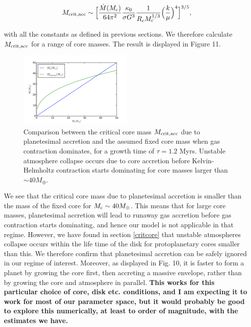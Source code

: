 \documentclass[apj]{emulateapj}
\begin{document}
\begin{equation}
\label{eq:critraf}
M_{\rm{crit, acc}} \sim \Big[\frac{\dot{M}(M_{\rm{c}})}{64 \pi^2} \frac{\kappa_0}{\sigma G^3} \frac{1}{R_c M_c^{1/3}} \Big(\frac{k}{\mu}\Big)^4\Big]^{3/5},
\end{equation}

\noindent with all the constants as defined in previous sections. We therefore calculate $M_{\rm{crit,acc}}$ for a range of core masses. The result is displayed in Figure 11. 

 \begin{figure}[h]
\centering
\includegraphics[width=0.5\textwidth]{../../figs/ModelAtmospheres/RadSelfGravPoly/PaperFigs/critcore.pdf}
\caption{Comparison between the critical core mass $M_{\rm{crit, acc}}$ due to planetesimal accretion and the assumed fixed core mass when gas contraction dominates, for a growth time of $\tau=1.2$ Myrs. Unstable atmosphere collapse occurs due to core accretion before Kelvin-Helmholtz contraction starts dominating for core masses larger than $\sim 40 M_{\oplus}$.}
\end{figure}

We see that the critical core mass due to planetesimal accretion is smaller than the mass of the fixed core for $M_{\rm{c}} \sim 40 M_{\oplus}$. This means that for large core masses, planetesimal accretion will lead to runaway gas accretion before gas contraction starts dominating, and hence our model is not applicable in that regime. However, we have found in section \ref{critcore} that unstable atmospheres collapse occurs within the life time of the disk for protoplanetary cores smaller than this. We therefore confirm that planetesimal accretion can be safely ignored in our regime of interest. Moreover, as displayed in Fig. 10, it is faster to form a planet by growing the core first, then accreting a massive envelope, rather than by growing the core and atmosphere in parallel. \textbf{This works for this particular choice of core, disk etc. conditions, and I am expecting it to work for most of our parameter space, but it would probably be good to explore this numerically, at least to order of magnitude, with the estimates we have.} 
\end{document}
